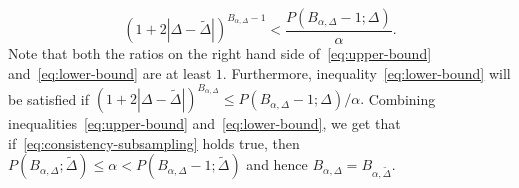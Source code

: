 \documentclass{article}
\numberwithin{myalgctr}{section}
\begin{document}
\begin{equation}\label{eq:lower-bound}
\left(1 + 2|\Delta - \widetilde{\Delta}|\right)^{B_{\alpha,\Delta} - 1} < \frac{P(B_{\alpha,\Delta} - 1; \Delta)}{\alpha}.
\end{equation}
Note that both the ratios on the right hand side of~\eqref{eq:upper-bound} and~\eqref{eq:lower-bound} are at least $1$. Furthermore, inequality~\eqref{eq:lower-bound} will be satisfied if $(1 + 2|\Delta - \widetilde{\Delta}|)^{B_{\alpha,\Delta}} \le {P(B_{\alpha,\Delta} - 1; \Delta)}/{\alpha}.$
Combining inequalities~\eqref{eq:upper-bound} and~\eqref{eq:lower-bound}, we get that if~\eqref{eq:consistency-subsampling} holds true, then $P(B_{\alpha,\Delta}; \widetilde{\Delta}) \le \alpha < P(B_{\alpha,\Delta}-1;\widetilde{\Delta})$ and hence $B_{\alpha,\Delta} = B_{\alpha,\widetilde{\Delta}}$.
\end{document}
